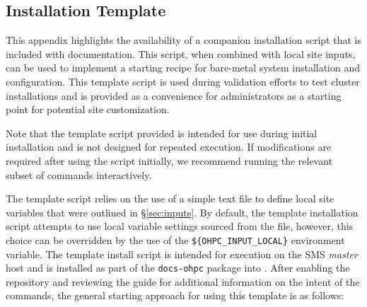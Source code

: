 \subsection{Installation Template}  \label{appendix:template_script}

This appendix highlights the availability of a companion installation script
that is included with \OHPC{} documentation. This script, when combined with
local site inputs, can be used to implement a starting recipe for
bare-metal system installation and configuration. This template script is used
during validation efforts to test cluster installations and is provided as a
convenience for administrators as a starting point for potential site
customization.

\vspace*{0.1cm}

\begin{center}
\begin{tcolorbox}[]
\small Note that the template script provided is intended for use during
initial installation and is not designed for repeated execution.  If
modifications are required after using the script initially, we recommend
running the relevant subset of commands interactively.
\end{tcolorbox}
\end{center}

The template script relies on the use of a simple text file to define local
site variables that were outlined in \S\ref{sec:inputs}. By default, the
template installation script attempts to use local variable settings sourced from
the  file, however, this
choice can be overridden by the use of the \texttt{\$\{OHPC\_INPUT\_LOCAL\}}
environment variable. The template install script is intended for execution on
the SMS {\em master} host and is installed as part of the \texttt{docs-ohpc}
package into . After
enabling the \OHPC{} repository and reviewing the guide for additional
information on the intent of the commands, the general starting approach for
using this template is as follows:

